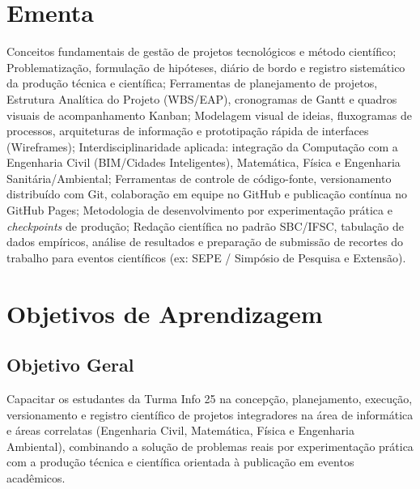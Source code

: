 \documentclass[12pt,a4paper]{article}
\begin{document}
\section{Ementa}

Conceitos fundamentais de gestão de projetos tecnológicos e método científico; Problematização, formulação de hipóteses, diário de bordo e registro sistemático da produção técnica e científica; Ferramentas de planejamento de projetos, Estrutura Analítica do Projeto (WBS/EAP), cronogramas de Gantt e quadros visuais de acompanhamento Kanban; Modelagem visual de ideias, fluxogramas de processos, arquiteturas de informação e prototipação rápida de interfaces (Wireframes); Interdisciplinaridade aplicada: integração da Computação com a Engenharia Civil (BIM/Cidades Inteligentes), Matemática, Física e Engenharia Sanitária/Ambiental; Ferramentas de controle de código-fonte, versionamento distribuído com Git, colaboração em equipe no GitHub e publicação contínua no GitHub Pages; Metodologia de desenvolvimento por experimentação prática e \textit{checkpoints} de produção; Redação científica no padrão SBC/IFSC, tabulação de dados empíricos, análise de resultados e preparação de submissão de recortes do trabalho para eventos científicos (ex: SEPE / Simpósio de Pesquisa e Extensão).

\section{Objetivos de Aprendizagem}

\subsection{Objetivo Geral}
Capacitar os estudantes da Turma Info 25 na concepção, planejamento, execução, versionamento e registro científico de projetos integradores na área de informática e áreas correlatas (Engenharia Civil, Matemática, Física e Engenharia Ambiental), combinando a solução de problemas reais por experimentação prática com a produção técnica e científica orientada à publicação em eventos acadêmicos.
\end{document}
